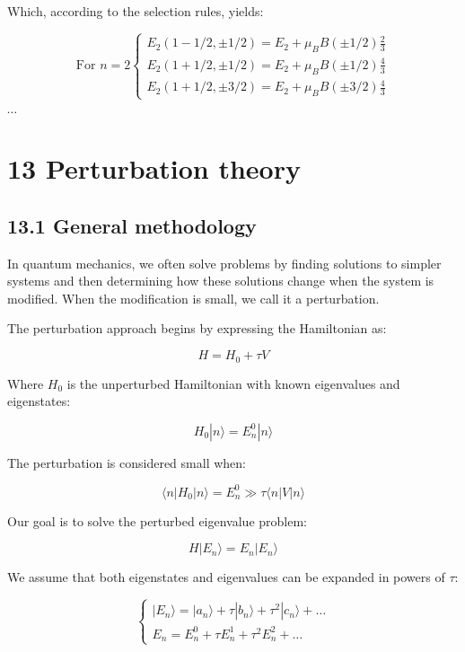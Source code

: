 \documentclass[10pt]{article}
\begin{document}
Which, according to the selection rules, yields:

\[
\text{For } n=2\left\{\begin{array}{l}
E_2(1-1/2,\pm 1/2)=E_2+\mu_B B(\pm 1/2)\frac{2}{3} \tag{12.59}\\
E_2(1+1/2,\pm 1/2)=E_2+\mu_B B(\pm 1/2)\frac{4}{3}\\
E_2(1+1/2,\pm 3/2)=E_2+\mu_B B(\pm 3/2)\frac{4}{3}
\end{array}\right.
\]

$\cdots$

\section*{13 Perturbation theory}
\subsection*{13.1 General methodology}
In quantum mechanics, we often solve problems by finding solutions to simpler systems and then determining how these solutions change when the system is modified. When the modification is small, we call it a perturbation.


The perturbation approach begins by expressing the Hamiltonian as:

\begin{equation*}
H=H_0+\tau V \tag{13.1}
\end{equation*}

Where $H_0$ is the unperturbed Hamiltonian with known eigenvalues and eigenstates:

\begin{equation*}
H_0|n\rangle=E_n^0|n\rangle \tag{13.2}
\end{equation*}

The perturbation is considered small when:

\begin{equation*}
\langle n|H_0|n\rangle=E_n^0 \gg \tau\langle n|V|n\rangle \tag{13.3}
\end{equation*}

Our goal is to solve the perturbed eigenvalue problem:

\begin{equation*}
H|E_n\rangle=E_n|E_n\rangle \tag{13.4}
\end{equation*}

We assume that both eigenstates and eigenvalues can be expanded in powers of $\tau$:

\[
\left\{\begin{array}{l}
|E_n\rangle=|a_n\rangle+\tau|b_n\rangle+\tau^2|c_n\rangle+\ldots \tag{13.5}\\
E_n=E_n^0+\tau E_n^1+\tau^2 E_n^2+\ldots
\end{array}\right.
\]
\end{document}
